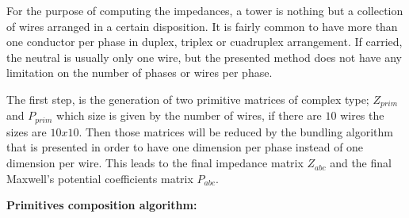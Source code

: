 \documentclass[nols,a4paper,twoside,notoc,fleqn]{tufte-book}
\begin{document}
For the purpose of computing the impedances, a tower is nothing but a collection of wires arranged in a certain disposition. It is fairly common to have more than one conductor per phase in duplex, triplex or cuadruplex arrangement. If carried, the neutral is usually only one wire, but the presented method does not have any limitation on the number of phases or wires per phase.

The first step, is the generation of two primitive matrices of complex type; $Z_{prim}$ and $P_{prim}$ which size is given by the number of wires, if there are $10$ wires the sizes are $10 x 10$. Then those matrices will be reduced by the bundling algorithm that is presented in order to have one dimension per phase instead of one dimension per wire. This leads to the final impedance matrix $Z_{abc}$ and the final Maxwell's potential coefficients matrix $P_{abc}$. 
 
 \vspace{0.5cm}
  
\textbf{Primitives composition algorithm:}
\end{document}
